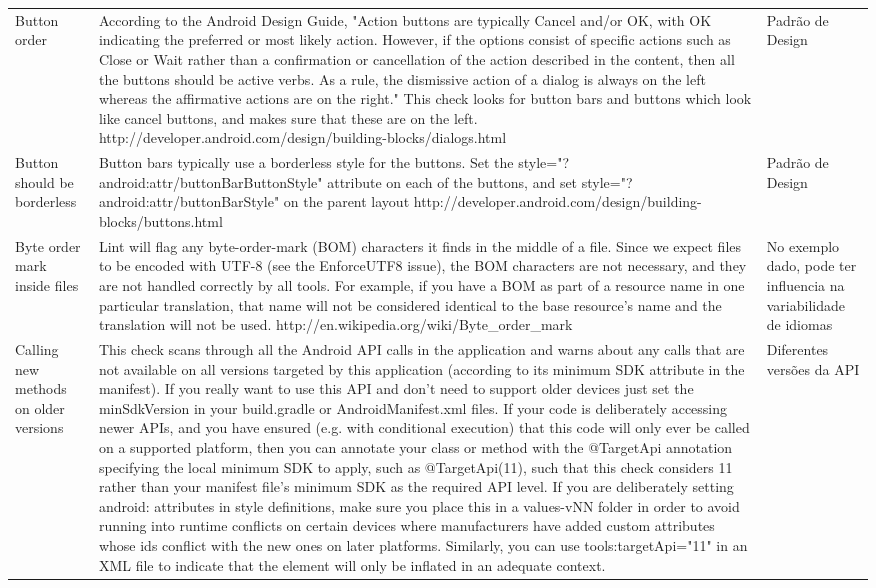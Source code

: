 \begin{landscape}
\begin{longtable}{p{30mm}|p{180mm}|p{25mm}}
Button order & According to the Android Design Guide, "Action buttons are typically
Cancel and/or OK, with OK indicating the preferred or most likely action. However,
if the options consist of specific actions such as Close or Wait rather than a
confirmation or cancellation of the action described in the content, then all the
buttons should be active verbs. As a rule, the dismissive action of a dialog is
always on the left whereas the affirmative actions are on the right." This check
looks for button bars and buttons which look like cancel buttons, and makes sure
that these are on the left. http://developer.android.com/design/building-blocks/dialogs.html
& Padrão de Design \\

Button should be borderless & Button bars typically use a borderless style for
the buttons. Set the style="?android:attr/buttonBarButtonStyle" attribute on each
of the buttons, and set style="?android:attr/buttonBarStyle" on the parent layout
http://developer.android.com/design/building-blocks/buttons.html
& Padrão de Design \\

Byte order mark inside files & Lint will flag any byte-order-mark (BOM) characters
it finds in the middle of a file. Since we expect files to be encoded with UTF-8
(see the EnforceUTF8 issue), the BOM characters are not necessary, and they are
not handled correctly by all tools. For example, if you have a BOM as part of a
resource name in one particular translation, that name will not be considered
identical to the base resource's name and the translation will not be used.
http://en.wikipedia.org/wiki/Byte\_order\_mark
& No exemplo dado, pode ter influencia na variabilidade de idiomas\\
 
Calling new methods on older versions
&This check scans through all the Android API calls in the application and warns about any calls that are not available on all versions targeted by this application (according to its minimum SDK attribute in the manifest). If you really want to use this API and don't need to support older devices just set the minSdkVersion in your build.gradle or AndroidManifest.xml files. If your code is deliberately accessing newer APIs, and you have ensured (e.g. with conditional execution) that this code will only ever be called on a supported platform, then you can annotate your class or method with the @TargetApi annotation specifying the local minimum SDK to apply, such as @TargetApi(11), such that this check considers 11 rather than your manifest file's minimum SDK as the required API level. If you are deliberately setting android: attributes in style definitions, make sure you place this in a values-vNN folder in order to avoid running into runtime conflicts on certain devices where manufacturers have added custom attributes whose ids conflict with the new ones on later platforms. Similarly, you can use tools:targetApi="11" in an XML file to indicate that the element will only be inflated in an adequate context.
&Diferentes versões da API\\


\end{longtable}
\end{landscape}

